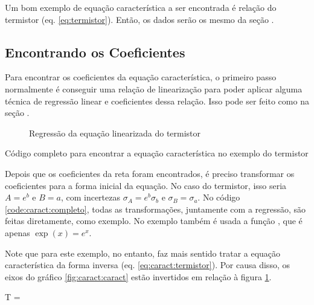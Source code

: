 Um bom exemplo de equação característica a ser encontrada é relação do termistor (eq. \ref{eq:termistor}). Então, os dados serão os mesmo da seção .


\subsection{Encontrando os Coeficientes}

    Para encontrar os coeficientes da equação característica, o primeiro passo normalmente é conseguir uma relação de linearização para poder aplicar alguma técnica de regressão linear e coeficientes dessa relação. Isso pode ser feito como na seção .

    \begin{figure}[H]
        \centering
        

        \caption{Regressão da equação linearizada do termistor}
        \label{fig:caract:regres}
    \end{figure}

    \begin{listing}[H]
        \caption{Código completo para encontrar a equação característica no exemplo do termistor}
        \label{code:caract:completo}

    \end{listing}

    Depois que os coeficientes da reta foram encontrados, é preciso transformar os coeficientes para a forma inicial da equação. No caso do termistor, isso seria $A = e^b$ e $B = a$, com incertezas $\sigma_A = e^b \sigma_b$ e $\sigma_B = \sigma_a$. No código \ref{code:caract:completo}, todas as transformações, juntamente com a regressão, são feitas diretamente, como exemplo. No exemplo também é usada a função , que é apenas $\exp(x) = e^x$.

    Note que para este exemplo, no entanto, faz mais sentido tratar a equação característica da forma inversa (eq. \ref{eq:caract:termistor}). Por causa disso, os eixos do gráfico \ref{fig:caract:caract} estão invertidos em relação à figura \ref{fig:caract:regres}.

    \begin{equacao} \label{eq:caract:termistor}
        T = 
    \end{equacao}


